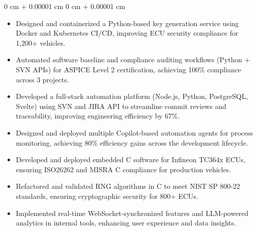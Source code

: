 \documentclass[10pt, letterpaper]{article}
\newenvironment{highlights}{
    \begin{itemize}[
        topsep=0.10 cm,
        parsep=0.10 cm,
        partopsep=0pt,
        itemsep=0pt,
        leftmargin=0 cm + 10pt
    ]
}{
    \end{itemize}
} %
\newenvironment{onecolentry}{
    \begin{adjustwidth}{
        0 cm + 0.00001 cm
    }{
        0 cm + 0.00001 cm
    }
}{
    \end{adjustwidth}
} %
\newenvironment{twocolentry}[2][]{
    \onecolentry
    \def\secondColumn{#2}
    \setcolumnwidth{\fill, 4.5 cm}
    \begin{paracol}{2}
}{
    \switchcolumn \raggedleft \secondColumn
    \end{paracol}
    \endonecolentry
} %
\begin{document}
\vspace{0.10 cm}
\begin{onecolentry}
    \begin{highlights}
        \item Designed and containerized a Python-based key generation service using Docker and Kubernetes CI/CD, improving ECU security compliance for 1,200+ vehicles. 
        \item Automated software baseline and compliance auditing workflows (Python + SVN APIs) for ASPICE Level 2 certification, achieving 100\% compliance across 3 projects.
        \item Developed a full-stack automation platform (Node.js, Python, PostgreSQL, Svelte) using SVN and JIRA API to streamline commit reviews and traceability, improving engineering efficiency by 67\%.
        \item Designed and deployed multiple Copilot-based automation agents for process monitoring, achieving 80\% efficiency gains across the development lifecycle.
        \item Developed and deployed embedded C software for Infineon TC364x ECUs, ensuring ISO26262 and MISRA C compliance for production vehicles.
        \item Refactored and validated RNG algorithms in C to meet NIST SP 800-22 standards, ensuring cryptographic security for 800+ ECUs.
        \item Implemented real-time WebSocket-synchronized features and LLM-powered analytics in internal tools, enhancing user experience and data insights.
    \end{highlights}
\end{onecolentry}



\end{document}
